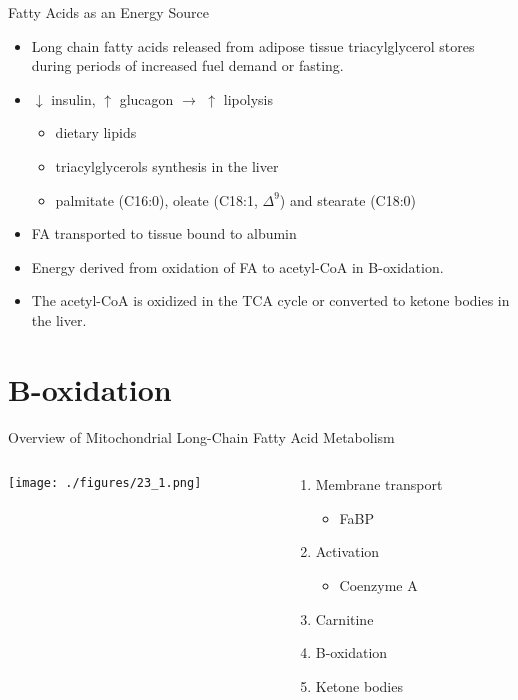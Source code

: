 \documentclass[presentation, smaller]{beamer}
\begin{document}
\begin{frame}[label={sec:orgheadline4}]{Fatty Acids as an Energy Source}
\begin{itemize}
\item Long chain fatty acids released from adipose tissue triacylglycerol
stores during periods of increased fuel demand or fasting.
\item \(\downarrow\) insulin, \(\uparrow\) glucagon \(\to\) \(\uparrow\) lipolysis
\begin{itemize}
\item dietary lipids
\item triacylglycerols synthesis in the liver
\item palmitate (C16:0), oleate (C18:1, \(\Delta ^9\)) and stearate (C18:0)
\end{itemize}
\item FA transported to tissue bound to albumin
\item Energy derived from oxidation of FA to acetyl-CoA in B-oxidation.
\item The acetyl-CoA is oxidized in the TCA cycle or converted to ketone bodies in the liver.
\end{itemize}
\end{frame}

\section{B-oxidation}
\label{sec:orgheadline15}
\begin{frame}[label={sec:orgheadline6}]{Overview of Mitochondrial Long-Chain Fatty Acid Metabolism}
\begin{columns}
\begin{column}{0.5\columnwidth}
\centering
\texttt{[image: ./figures/23\_1.png]}
\end{column}

\begin{column}{0.5\columnwidth}
\begin{enumerate}
\item Membrane transport
\begin{itemize}
\item FaBP
\end{itemize}
\item Activation
\begin{itemize}
\item Coenzyme A
\end{itemize}
\item Carnitine
\item B-oxidation
\item Ketone bodies
\end{enumerate}
\end{column}
\end{columns}
\end{frame}
\end{document}
